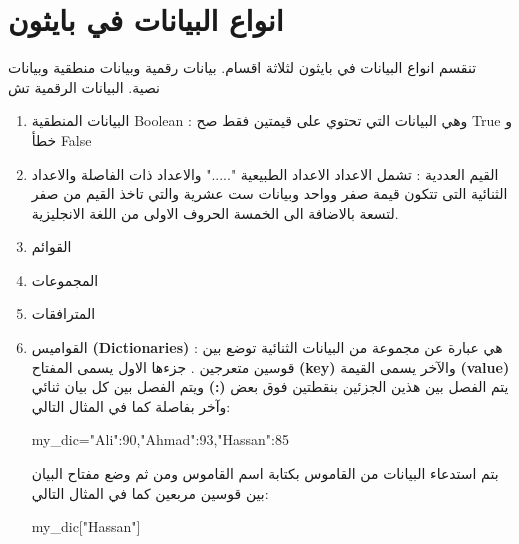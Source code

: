 \section{انواع البيانات في بايثون}
تنقسم انواع البيانات في بايثون لثلاثة اقسام. بيانات رقمية وبيانات منطقية وبيانات نصية. البيانات الرقمية تش
\begin{enumerate}
\item
البيانات المنطقية
\textenglish{Boolean}
: وهي البيانات التي تحتوي على قيمتين فقط صح
\textenglish{True} 
و خطأ
\textenglish{False}
\item
القيم العددية :
تشمل الاعداد الاعداد الطبيعية "....." والاعداد ذات الفاصلة والاعداد الثنائية التى تتكون قيمة صفر وواحد وبيانات ست عشرية والتي تاخذ القيم من صفر لتسعة بالاضافة الى الخمسة الحروف الاولى من اللغة الانجليزية.
\item
القوائم
\item
المجموعات
\item
المترافقات
\item
القواميس
\textenglish{\large\textbf{(Dictionaries)} }
 : هي عبارة عن مجموعة من البيانات الثنائية توضع بين قوسين متعرجين . جزءها الاول يسمى المفتاح
\textenglish{\large\textbf{(key)}}
والآخر يسمى القيمة
\textenglish{\large\textbf{(value)}}
يتم الفصل بين هذين الجزئين بنقطتين فوق بعض 
\textenglish{\large\textbf{(:)}}
ويتم الفصل بين كل بيان ثنائي وآخر بفاصلة كما في المثال التالي:
\begin{english}
\begin{mybox}
\begin{pyconsole}
my_dic={"Ali":90,"Ahmad":93,"Hassan":85}
\end{pyconsole}
\end{mybox}
\end{english}
بتم استدعاء البيانات من القاموس بكتابة اسم القاموس ومن ثم وضع مفتاح البيان بين قوسين مربعين كما في المثال التالي:
\begin{english}
\begin{mybox}
\begin{pyconsole}
my_dic["Hassan"]
\end{pyconsole}
\end{mybox}
\end{english}
\end{enumerate}
